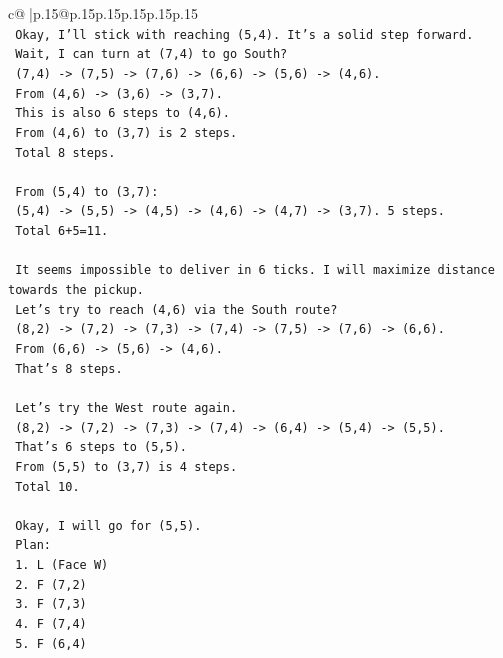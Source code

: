 \documentclass{article}
\begin{document}
{\begin{supertabular}{c@{$\;$}|p{.15\linewidth}@{}p{.15\linewidth}p{.15\linewidth}p{.15\linewidth}p{.15\linewidth}p{.15\linewidth}}
{{{\\ 
\texttt{   Okay, I'll stick with reaching (5,4). It's a solid step forward.} \\
\texttt{   Wait, I can turn at (7,4) to go South?} \\
\texttt{   (7,4) {-}> (7,5) {-}> (7,6) {-}> (6,6) {-}> (5,6) {-}> (4,6).} \\
\texttt{   From (4,6) {-}> (3,6) {-}> (3,7).} \\
\texttt{   This is also 6 steps to (4,6).} \\
\texttt{   From (4,6) to (3,7) is 2 steps.} \\
\texttt{   Total 8 steps.} \\
\\ 
\texttt{   From (5,4) to (3,7):} \\
\texttt{   (5,4) {-}> (5,5) {-}> (4,5) {-}> (4,6) {-}> (4,7) {-}> (3,7). 5 steps.} \\
\texttt{   Total 6+5=11.} \\
\\ 
\texttt{   It seems impossible to deliver in 6 ticks. I will maximize distance towards the pickup.} \\
\texttt{   Let's try to reach (4,6) via the South route?} \\
\texttt{   (8,2) {-}> (7,2) {-}> (7,3) {-}> (7,4) {-}> (7,5) {-}> (7,6) {-}> (6,6).} \\
\texttt{   From (6,6) {-}> (5,6) {-}> (4,6).} \\
\texttt{   That's 8 steps.} \\
\\ 
\texttt{   Let's try the West route again.} \\
\texttt{   (8,2) {-}> (7,2) {-}> (7,3) {-}> (7,4) {-}> (6,4) {-}> (5,4) {-}> (5,5).} \\
\texttt{   That's 6 steps to (5,5).} \\
\texttt{   From (5,5) to (3,7) is 4 steps.} \\
\texttt{   Total 10.} \\
\\ 
\texttt{   Okay, I will go for (5,5).} \\
\texttt{   Plan:} \\
\texttt{   1. L (Face W)} \\
\texttt{   2. F (7,2)} \\
\texttt{   3. F (7,3)} \\
\texttt{   4. F (7,4)} \\
\texttt{   5. F (6,4)} \\
}}}
\end{supertabular}}
\end{document}
